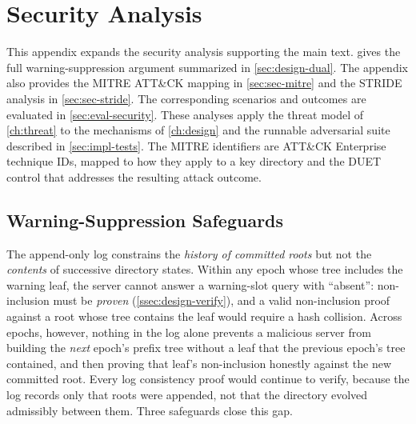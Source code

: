 \chapter{Security Analysis}\label{app:security}

This appendix expands the security analysis supporting the main text.
 gives the full warning-suppression argument summarized in
\cref{sec:design-dual}. The appendix also provides the MITRE ATT\&CK mapping in
\cref{sec:sec-mitre} and the STRIDE analysis in \cref{sec:sec-stride}. The corresponding scenarios
and outcomes are evaluated in \cref{sec:eval-security}. These analyses apply the threat model of
\cref{ch:threat} to the mechanisms of \cref{ch:design} and the runnable adversarial suite described
in \cref{sec:impl-tests}. The MITRE identifiers are ATT\&CK Enterprise
technique IDs, mapped to how they apply to a key directory and the DUET control that
addresses the resulting attack outcome.

\section{Warning-Suppression Safeguards}\label{sec:sec-suppression}

The append-only log constrains the \emph{history of committed roots} but not the \emph{contents} of
successive directory states. Within
any epoch whose tree includes the warning leaf, the server cannot answer a warning-slot query with
``absent'': non-inclusion must be \emph{proven} (\cref{ssec:design-verify}), and a valid
non-inclusion proof against a root whose tree contains the leaf would require a hash collision.
Across epochs, however, nothing in the log alone prevents a malicious server from building the
\emph{next} epoch's prefix tree without a leaf that the previous epoch's tree contained, and then
proving that leaf's non-inclusion honestly against the new committed root. Every log consistency
proof would continue to verify, because the log records only that roots were appended, not that the
directory evolved admissibly between them. Three safeguards close this gap.

